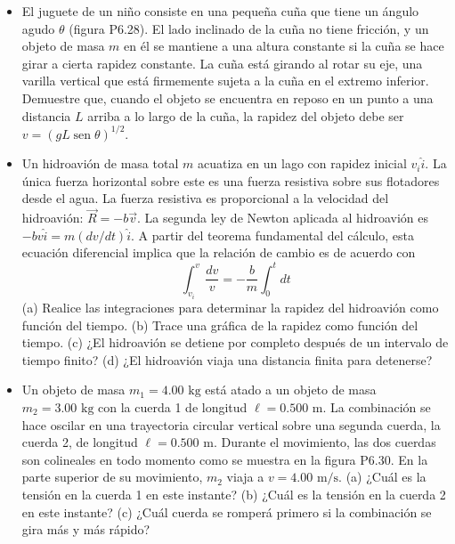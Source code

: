 \documentclass[11pt,a4paper]{article}
\begin{document}
\newpage

\begin{itemize}
    \item[\textbf{28.}] El juguete de un niño consiste en una pequeña cuña que tiene un ángulo agudo $\theta$ (figura P6.28). El lado inclinado de la cuña no tiene fricción, y un objeto de masa $m$ en él se mantiene a una altura constante si la cuña se hace girar a cierta rapidez constante. La cuña está girando al rotar su eje, una varilla vertical que está firmemente sujeta a la cuña en el extremo inferior. Demuestre que, cuando el objeto se encuentra en reposo en un punto a una distancia $L$ arriba a lo largo de la cuña, la rapidez del objeto debe ser $v = (gL \operatorname{sen}\theta)^{1/2}$.
    \vspace*{6cm}

    \item[\textbf{29.}] Un hidroavión de masa total $m$ acuatiza en un lago con rapidez inicial $v_i\hat{i}$. La única fuerza horizontal sobre este es una fuerza resistiva sobre sus flotadores desde el agua. La fuerza resistiva es proporcional a la velocidad del hidroavión: $\vec{R} = -b\vec{v}$. La segunda ley de Newton aplicada al hidroavión es $-bv\hat{i} = m(dv/dt)\hat{i}$. A partir del teorema fundamental del cálculo, esta ecuación diferencial implica que la relación de cambio es de acuerdo con
    $$ \int_{v_i}^{v} \frac{dv}{v} = -\frac{b}{m} \int_{0}^{t} dt $$
    (a) Realice las integraciones para determinar la rapidez del hidroavión como función del tiempo. (b) Trace una gráfica de la rapidez como función del tiempo. (c) ¿El hidroavión se detiene por completo después de un intervalo de tiempo finito? (d) ¿El hidroavión viaja una distancia finita para detenerse?
    \vspace*{8cm}

    \item[\textbf{30.}] Un objeto de masa $m_1 = 4.00 \text{ kg}$ está atado a un objeto de masa $m_2 = 3.00 \text{ kg}$ con la cuerda 1 de longitud $\ell = 0.500 \text{ m}$. La combinación se hace oscilar en una trayectoria circular vertical sobre una segunda cuerda, la cuerda 2, de longitud $\ell = 0.500 \text{ m}$. Durante el movimiento, las dos cuerdas son colineales en todo momento como se muestra en la figura P6.30. En la parte superior de su movimiento, $m_2$ viaja a $v = 4.00 \text{ m/s}$. (a) ¿Cuál es la tensión en la cuerda 1 en este instante? (b) ¿Cuál es la tensión en la cuerda 2 en este instante? (c) ¿Cuál cuerda se romperá primero si la combinación se gira más y más rápido?
    \vspace*{7cm}


\end{itemize}
\end{document}

